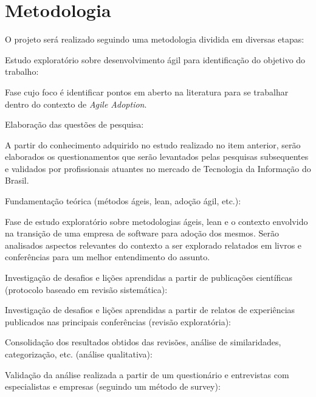 \documentclass[a4paper,11pt]{article}
\newcounter{contadorDeEtapas}
\begin{document}
\section{Metodologia}
O projeto será realizado seguindo uma metodologia dividida em diversas etapas:
\begin{list}{\bfseries{}E -~}{\bfseries}
		\item Estudo exploratório sobre desenvolvimento ágil para identificação do objetivo do trabalho:

			\textnormal{Fase cujo foco é identificar pontos em aberto na literatura para se trabalhar dentro do contexto de \textit{Agile Adoption}.}

		\item Elaboração das questões de pesquisa:

			\textnormal{A partir do conhecimento adquirido no estudo realizado no item anterior, serão elaborados os questionamentos que serão levantados pelas pesquisas subsequentes e validados por profissionais atuantes no mercado de Tecnologia da Informação do Brasil.}

		\item Fundamentação teórica (métodos ágeis, lean, adoção ágil, etc.):

			\textnormal{Fase de estudo exploratório sobre metodologias ágeis, lean e o contexto envolvido na transição de uma empresa de software para adoção dos mesmos. Serão analisados aspectos relevantes do contexto a ser explorado relatados em livros e conferências para um melhor entendimento do assunto.}

		\item Investigação de desafios e lições aprendidas  a partir de publicações científicas (protocolo baseado em revisão sistemática):

			\textnormal{}

		\item Investigação de desafios e lições aprendidas  a partir de relatos de experiências publicados nas principais conferências (revisão exploratória):

			\textnormal{}

		\item Consolidação dos resultados obtidos das revisões, análise de similaridades, categorização, etc. (análise qualitativa):

			\textnormal{}

		\item Validação da análise realizada a partir de um questionário e entrevistas com especialistas e empresas (seguindo um método de survey):


\end{list}
\end{document}
